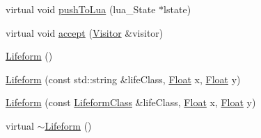 \begin{DoxyCompactItemize}
virtual void \hyperlink{classZeta_1_1Lifeform_a23778517011fd3df0af5413fbfa5ff5c}{push\+To\+Lua} (lua\+\_\+\+State $\ast$lstate)
\item 
virtual void \hyperlink{classZeta_1_1Lifeform_a8d9df7a3696d586e7eba63a165a40425}{accept} (\hyperlink{classZeta_1_1Visitor}{Visitor} \&visitor)
\item 
\hyperlink{classZeta_1_1Lifeform_a04bc53d1a8c4fb72aec2f244445d69e3}{Lifeform} ()
\item 
\hyperlink{classZeta_1_1Lifeform_af5f68ee9aa65abb1ed775b2eada6201b}{Lifeform} (const std\+::string \&life\+Class, \hyperlink{namespaceZeta_a1e0a1265f9b3bd3075fb0fabd39088ba}{Float} x, \hyperlink{namespaceZeta_a1e0a1265f9b3bd3075fb0fabd39088ba}{Float} y)
\item 
\hyperlink{classZeta_1_1Lifeform_a2faa49721af756f9d12aefa074b5f010}{Lifeform} (const \hyperlink{classZeta_1_1LifeformClass}{Lifeform\+Class} \&life\+Class, \hyperlink{namespaceZeta_a1e0a1265f9b3bd3075fb0fabd39088ba}{Float} x, \hyperlink{namespaceZeta_a1e0a1265f9b3bd3075fb0fabd39088ba}{Float} y)
\item 
virtual \hyperlink{classZeta_1_1Lifeform_acd76f41ddac833fd7053c99a8b522d4b}{$\sim$\+Lifeform} ()
\end{DoxyCompactItemize}
